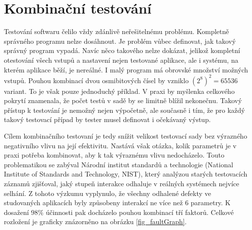 \chapter{Kombinační testování} 
\label{ch_combTesting}
Testování softwaru čelilo vždy zdánlivě neřešitelnému problému. Kompletně správného programu nelze dosáhnout. Je problém vůbec definovat, jak takový správný program vypadá. Navíc něco takového nelze dokázat, jelikož kompletní otestování všech vstupů a nastavení nejen testované aplikace, ale i systému, na kterém aplikace běží, je nereálné. I malý program má obrovské množství možných vstupů. Pouhou kombinací dvou osmibitových čísel by vzniklo $(2^8)^2 = 65536$ variant. To je však pouze jednoduchý příklad. V praxi by myšlenka celkového pokrytí znamenala, že počet testů v sadě by se limitně blížil nekonečnu. Takový přístup k testování je nemožný nejen výpočetně, ale současně i tím, že pro každý takový testovací případ by tester musel definovat i očekávaný výstup.\cite{1_Combine}  


Cílem kombinačního testovaní je tedy snížit velikost testovací sady bez výrazného negativního vlivu na její efektivitu. Nastává však otázka, kolik parametrů je v praxi potřeba kombinovat, aby k tak výraznému vlivu nedocházelo. Touto problematikou se zabýval Národní institut standardů a technologie (National Institute of Standards and Technology, NIST), který analýzou starých testovacích záznamů zjišťoval, jaký stupeň interakce odhaluje v reálných systémech nejvíce selhání. Z tohoto výzkumu vyplynulo, že všechny odhalené defekty ve studovaných aplikacích byly způsobeny interakcí ne více než 6 parametry. K dosažení $98\%$ účinnosti pak docházelo pouhou kombinací tří faktorů. Celkové rozložení je graficky znázorněno na obrázku \ref{fig_faultGraph}.\cite{4_IntroductionToCombinatorialTesting} 

